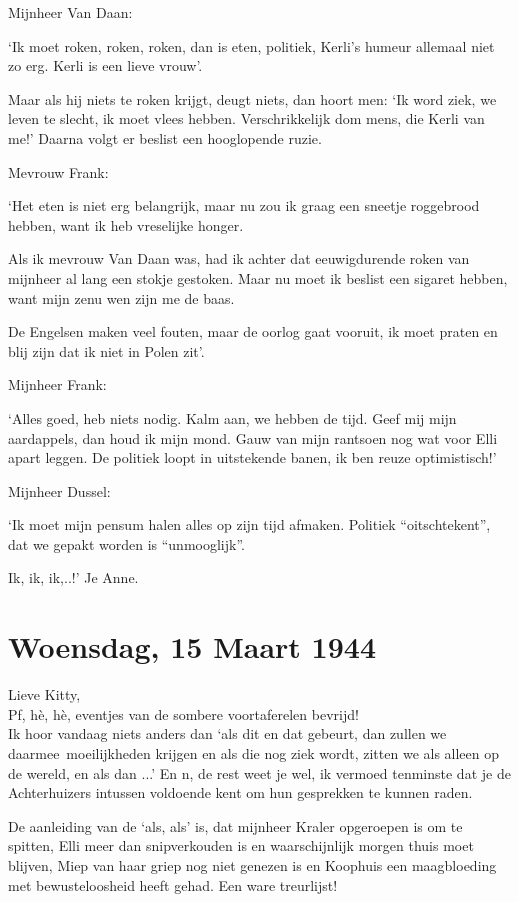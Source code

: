\documentclass{book}
\begin{document}
Mijnheer Van Daan:

`Ik moet roken, roken, roken, dan is eten, politiek, Kerli's humeur
allemaal niet zo erg. Kerli is een lieve vrouw'.

Maar als hij niets te roken krijgt, deugt niets, dan hoort men: `Ik word
ziek, we leven te slecht, ik moet vlees hebben. Verschrikkelijk dom
mens, die Kerli van me!' Daarna volgt er beslist een hooglopende ruzie.

Mevrouw Frank:

`Het eten is niet erg belangrijk, maar nu zou ik graag een sneetje
roggebrood hebben, want ik heb vreselijke honger.

Als ik mevrouw Van Daan was, had ik achter dat eeuwigdurende roken van
mijnheer al lang een stokje gestoken. Maar nu moet ik beslist een
sigaret hebben, want mijn zenu wen zijn me de baas.

De Engelsen maken veel fouten, maar de oorlog gaat vooruit, ik moet
praten en blij zijn dat ik niet in Polen zit'.

Mijnheer Frank:

`Alles goed, heb niets nodig. Kalm aan, we hebben de tijd. Geef mij mijn
aardappels, dan houd ik mijn mond. Gauw van mijn rantsoen nog wat voor
Elli apart leggen. De politiek loopt in uitstekende banen, ik ben reuze
optimistisch!'

Mijnheer Dussel:

`Ik moet mijn pensum halen alles op zijn tijd afmaken. Politiek
``oitschtekent'', dat we gepakt worden is ``unmooglijk''.

Ik, ik, ik,..!' Je Anne.

\chapter{Woensdag, 15 Maart 1944}

Lieve Kitty,\\Pf, hè, hè, eventjes van de sombere voortaferelen
bevrijd!\\Ik hoor vandaag niets anders dan `als dit en dat gebeurt, dan
zullen we daarmee~moeilijkheden krijgen en als die nog ziek wordt,
zitten we als alleen op de wereld, en als dan ...' En n, de rest weet je
wel, ik vermoed tenminste dat je de Achterhuizers intussen voldoende
kent om hun gesprekken te kunnen raden.

De aanleiding van de `als, als' is, dat mijnheer Kraler opgeroepen is om
te spitten, Elli meer dan snipverkouden is en waarschijnlijk morgen
thuis moet blijven, Miep van haar griep nog niet genezen is en Koophuis
een maagbloeding met bewusteloosheid heeft gehad. Een ware treurlijst!
\end{document}
